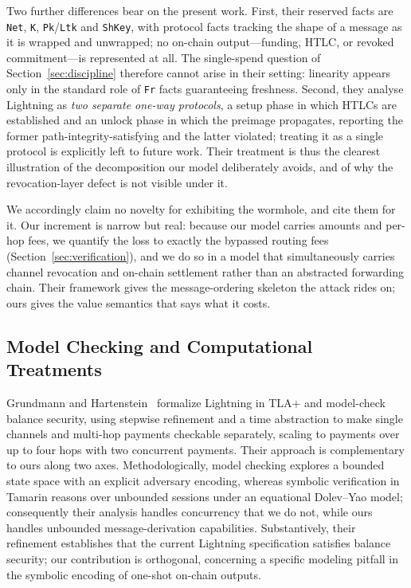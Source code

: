 \documentclass[sigconf,review]{acmart}
\theoremstyle{acmdefinition}
\begin{document}
Two further differences bear on the present work. First, their reserved facts are \texttt{Net}, \texttt{K}, \texttt{Pk}/\texttt{Ltk} and \texttt{ShKey}, with protocol facts tracking the shape of a message as it is wrapped and unwrapped; no on-chain output---funding, HTLC, or revoked commitment---is represented at all. The single-spend question of Section~\ref{sec:discipline} therefore cannot arise in their setting: linearity appears only in the standard role of \texttt{Fr} facts guaranteeing freshness. Second, they analyse Lightning as \emph{two separate one-way protocols}, a setup phase in which HTLCs are established and an unlock phase in which the preimage propagates, reporting the former path-integrity-satisfying and the latter violated; treating it as a single protocol is explicitly left to future work. Their treatment is thus the clearest illustration of the decomposition our model deliberately avoids, and of why the revocation-layer defect is not visible under it.

We accordingly claim no novelty for exhibiting the wormhole, and cite them for it. Our increment is narrow but real: because our model carries amounts and per-hop fees, we quantify the loss to exactly the bypassed routing fees (Section~\ref{sec:verification}), and we do so in a model that simultaneously carries channel revocation and on-chain settlement rather than an abstracted forwarding chain. Their framework gives the message-ordering skeleton the attack rides on; ours gives the value semantics that says what it costs.

\subsection{Model Checking and Computational Treatments}
Grundmann and Hartenstein~\cite{grundmann2025model} formalize Lightning in TLA+ and model-check balance security, using stepwise refinement and a time abstraction to make single channels and multi-hop payments checkable separately, scaling to payments over up to four hops with two concurrent payments. Their approach is complementary to ours along two axes. Methodologically, model checking explores a bounded state space with an explicit adversary encoding, whereas symbolic verification in Tamarin reasons over unbounded sessions under an equational Dolev--Yao model; consequently their analysis handles concurrency that we do not, while ours handles unbounded message-derivation capabilities. Substantively, their refinement establishes that the current Lightning specification satisfies balance security; our contribution is orthogonal, concerning a specific modeling pitfall in the symbolic encoding of one-shot on-chain outputs.
\end{document}
